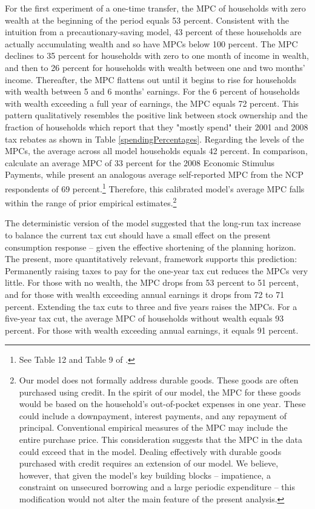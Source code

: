\documentclass[fleqccn,12pt]{article}
\begin{document}
For the first experiment of a one-time transfer, the MPC of households with zero wealth at the beginning of the period equals 53 percent. Consistent with the intuition from a precautionary-saving model, 43 percent of these households are actually accumulating wealth and so have MPCs below 100 percent. The MPC declines to 35 percent for households with zero to one month of income in wealth, and then to 26 percent for households with wealth between one and two months' income. Thereafter, the MPC flattens out until it begins to rise for households with wealth between 5 and 6 months' earnings. For the 6 percent of households with wealth exceeding a full year of earnings, the MPC equals 72 percent. This pattern qualitatively resembles the positive link between stock ownership and the fraction of households which report that they "mostly spend" their 2001 and 2008 tax rebates as shown in Table \ref{spendingPercentages}.  Regarding the levels of the MPCs, the average across all model households equals 42 percent. In comparison,  \citet*{taxPolicy2010SahmShapiroSlemrod} calculate an average MPC of $33$ percent for the 2008 Economic Stimulus Payments, while \cite{nber2017ParkerSouleles} present an analogous average self-reported MPC from the NCP respondents of $69$ percent.\footnote{See Table 12 \citet*{taxPolicy2010SahmShapiroSlemrod} and Table 9 of \cite{nber2017ParkerSouleles}. } Therefore, this calibrated model's average MPC falls within the range of prior empirical estimates.\footnote{Our model does not formally address durable goods. These goods are often purchased using credit. In the spirit of our model, the MPC for these goods would be based on the household's out-of-pocket expenses in one year. These could include a downpayment, interest payments, and any repayment of principal. Conventional empirical measures of the MPC may include the entire purchase price. This consideration suggests that the MPC in the data could exceed that in the model. Dealing effectively with durable goods purchased with credit requires an extension of our model. We believe, however, that given the model's key building blocks -- impatience, a constraint on unsecured borrowing and a large periodic expenditure -- this modification would not alter the main feature of the present analysis.}

The deterministic version of the model suggested that the long-run tax increase to balance the current tax cut should have a small effect on the present consumption response -- given the effective shortening of the planning horizon. The present, more quantitatively relevant, framework supports this prediction:  Permanently raising taxes to pay for the one-year tax cut reduces the MPCs very little. For those with no wealth, the MPC drops from 53 percent to 51 percent, and for those with wealth exceeding annual earnings it drops from 72 to 71 percent.  Extending the tax cuts to three and five years raises the MPCs. For a five-year tax cut, the average MPC of households without wealth equals 93 percent. For those with wealth exceeding annual earnings, it equals 91 percent.  
\end{document}
